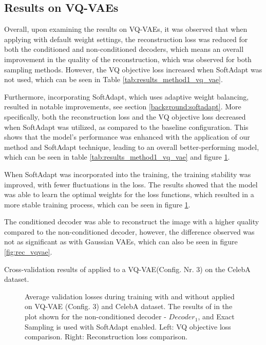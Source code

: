\subsection{Results on VQ-VAEs}

Overall, upon examining the results on VQ-VAEs, it was observed that when applying  with default weight settings, the reconstruction loss was reduced for both the conditioned and non-conditioned decoders, which means an overall improvement in the quality of the reconstruction, which was observed for both sampling methods. However, the VQ objective loss increased when SoftAdapt was not used, which can be seen in Table \ref{tab:results_method1_vq_vae}.

Furthermore, incorporating SoftAdapt, which uses adaptive weight balancing, resulted in notable improvements, see section \ref{background:softadapt}. More specifically, both the reconstruction loss and the VQ objective loss decreased when SoftAdapt was utilized, as compared to the baseline configuration. This shows that the model's performance was enhanced with the application of our method and SoftAdapt technique, leading to an overall better-performing model, which can be seen in table \ref{tab:results_method1_vq_vae} and figure \ref{fig:results_method1_vq_vae}. 

When SoftAdapt was incorporated into the training, the training stability was improved, with fewer fluctuations in the loss. The results showed that the model was able to learn the optimal weights for the loss functions, which resulted in a more stable training process, which can be seen in figure \ref{fig:results_method1_vq_vae}.

The conditioned decoder was able to reconstruct the image with a higher quality compared to the non-conditioned decoder, however, the difference observed was not as significant as with Gaussian VAEs, which can also be seen in figure \ref{fig:rec_vqvae}. 

\begin{table}[H]
    \centering
    
    \caption{Cross-validation results of  applied to a VQ-VAE(Config. Nr. 3) on the CelebA dataset.}
    \label{tab:results_method1_vq_vae}
\end{table}

\begin{figure}[H]
    \centering
    \scalebox{0.48}{}
    \scalebox{0.48}{}
    \caption[Validation loss comparison during training of a Gaussian VAE.]
    {
        Average validation losses during training with and without  applied on VQ-VAE (Config. 3) and CelebA dataset. The results of  in the plot shown for the non-conditioned decoder - $Decoder_1$, and Exact Sampling is used with SoftAdapt enabled.
        Left: VQ objective loss comparison. Right: Reconstruction loss comparison.
    }
    \label{fig:results_method1_vq_vae}
\end{figure}

